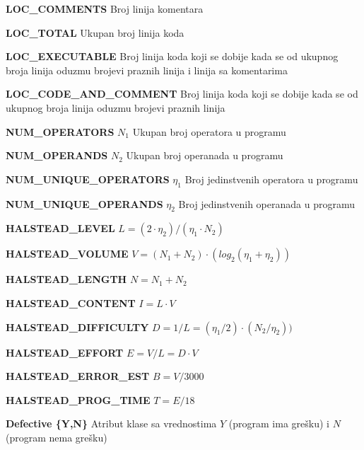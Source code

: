 \documentclass[12pt,oneside]{memoir}
\begin{document}
\textbf{LOC\_COMMENTS} Broj linija komentara

\textbf{LOC\_TOTAL} Ukupan broj linija koda

\textbf{LOC\_EXECUTABLE} Broj linija koda koji se dobije kada se od ukupnog broja linija oduzmu brojevi praznih linija i linija sa komentarima

\textbf{LOC\_CODE\_AND\_COMMENT} Broj linija koda koji se dobije kada se od ukupnog broja linija oduzmu brojevi praznih linija

\textbf{NUM\_OPERATORS} $N_1$ Ukupan broj operatora u programu

\textbf{NUM\_OPERANDS} $N_2$ Ukupan broj operanada u programu

\textbf{NUM\_UNIQUE\_OPERATORS} $\eta_1$ Broj jedinstvenih operatora u programu

\textbf{NUM\_UNIQUE\_OPERANDS} $\eta_2$ Broj jedinstvenih operanada u programu

\textbf{HALSTEAD\_LEVEL} $L = (2 \cdot \eta_2)/(\eta_1 \cdot N_2)$

\textbf{HALSTEAD\_VOLUME} $V = (N_1+N_2) \cdot (log_2(\eta_1+\eta_2))$ %

\textbf{HALSTEAD\_LENGTH} $N = N_1+N_2$

\textbf{HALSTEAD\_CONTENT} $I = L \cdot V$

\textbf{HALSTEAD\_DIFFICULTY} $D = 1/L = (\eta_1/2) \cdot (N_2/\eta_2))$

\textbf{HALSTEAD\_EFFORT} $E = V/L = D \cdot V$

\textbf{HALSTEAD\_ERROR\_EST} $B = V/3000$

\textbf{HALSTEAD\_PROG\_TIME} $T = E/18$

\textbf{Defective \{Y,N\} } Atribut klase sa vrednostima $Y$ (program ima grešku) i $N$ (program nema grešku)
\end{document}
